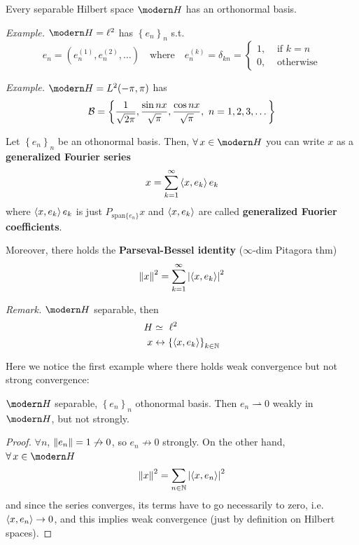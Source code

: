 \begin{thm}
Every separable Hilbert space $\Hc$ has an orthonormal basis.
\end{thm}

\emph{Example.} $\Hc=\ell^2$ has $\left\{ e_n \right\}_n$ s.t.
\begin{equation*}
e_n=\left( e_n^{(1)}, e_n^{(2)},\dots \right) \quad\text{where}\quad e_n^{(k)}=\delta_{kn}=\begin{cases}
    1, &\text{ if }k=n\\
    0, &\text{ otherwise}
\end{cases}
\end{equation*}

\emph{Example.} $\Hc=L^2(-\pi,\pi)$ has
\begin{equation*}
\Bdu=\left\{ \frac{1}{\sqrt{2\pi}}, \frac{\sin nx}{\sqrt{\pi}} , \frac{\cos nx}{\sqrt{\pi}}, \ n=1,2,3,\dots  \right\}
\end{equation*}

\begin{thm}
Let $\left\{ e_n \right\}_n$ be an othonormal basis. Then, $\forall x\in \Hc$ you can write $x$ as a \textbf{generalized Fourier series}
\begin{equation*}
    x=\sum_{k=1}^\infty \left\langle x,e_k \right\rangle e_k
\end{equation*}
where $\left\langle x,e_k \right\rangle e_k$ is just $P_{\text{span}\{e_n\}}x$ and $\left\langle x,e_k \right\rangle$ are called \textbf{generalized Fuorier coefficients}. 

Moreover, there holds the \textbf{Parseval-Bessel identity} ($\infty$-dim Pitagora thm)
\begin{equation*}
    \left\lVert x \right\rVert^2=\sum_{k=1}^\infty \left\lvert \left\langle x,e_k \right\rangle \right\rvert^2
\end{equation*}
\end{thm}

\emph{Remark.} $\Hc$ separable, then 
\begin{align*}
    H&\simeq\ \ell^2 \\
    x&\leftrightarrow \left\{ \left\langle x,e_k \right\rangle \right\}_{k\in\mathbb{N}}
\end{align*}

Here we notice the first example where there holds weak convergence but not strong convergence:
\begin{proposition}
$\Hc$ separable, $\left\{ e_n \right\}_n$ othonormal basis. Then $e_n\rightharpoonup 0$ weakly in $\Hc$, but not strongly.
\end{proposition}

\begin{proof}
$\forall n$, $\left\lVert e_n \right\rVert=1\not\to0$, so $e_n\not\to 0$ strongly. On the other hand, $\forall x\in\Hc$
\begin{equation*}
\left\lVert x \right\rVert^2=\sum_{n\in\mathbb{N}}\left\lvert \left\langle x,e_n \right\rangle \right\rvert^2
\end{equation*}
and since the series converges, its terms have to go necessarily to zero, i.e. $\left\langle x,e_n \right\rangle\to 0$, and this implies weak convergence (just by definition on Hilbert spaces).
\end{proof}


\setcounter{chapter}{14}
